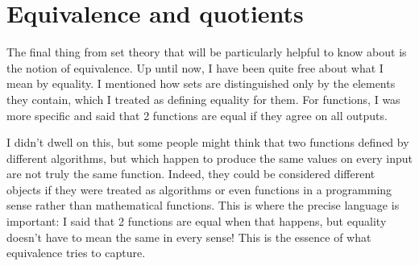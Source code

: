 \section{Equivalence and quotients}
The final thing from set theory that will be particularly helpful to know about is the notion of equivalence.
Up until now, I have been quite free about what I mean by equality. 
I mentioned how sets are distinguished only by the elements they contain, which I treated as defining equality for them.
For functions, I was more specific and said that 2 functions are equal if they agree on all outputs.

I didn't dwell on this, but some people might think that two functions defined by different algorithms, but which happen to produce the same values on every input are not truly the same function.
Indeed, they could be considered different objects if they were treated as algorithms or even functions in a programming sense rather than mathematical functions.
This is where the precise language is important: I said that 2 functions are equal when that happens, but equality doesn't have to mean the same in every sense!
This is the essence of what equivalence tries to capture.

